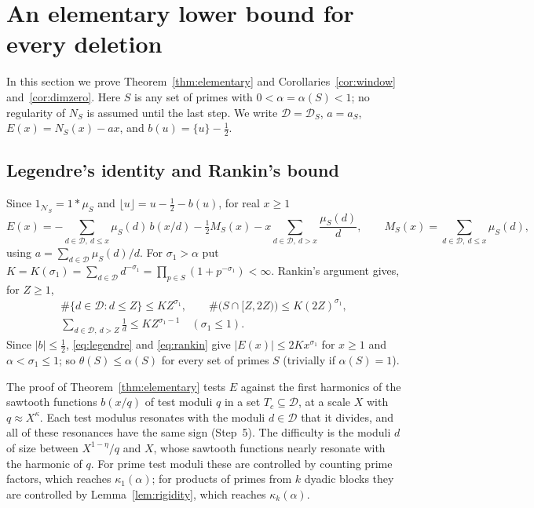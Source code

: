 \documentclass[11pt]{amsart}
\theoremstyle{remark}
\numberwithin{equation}{section}
\newcommand{\cD}{\mathcal{D}}
\newcommand{\cN}{\mathcal{N}}
\begin{document}
\section{An elementary lower bound for every deletion}\label{sec:elementary}

In this section we prove Theorem~\ref{thm:elementary} and Corollaries~\ref{cor:window} and~\ref{cor:dimzero}. Here $S$ is any set of primes with $0<\alpha=\alpha(S)<1$; no regularity of $N_S$ is assumed until the last step. We write $\cD=\cD_S$, $a=a_S$, $E(x)=N_S(x)-ax$, and $b(u)=\{u\}-\tfrac12$.

\subsection{Legendre's identity and Rankin's bound}\label{sec:legendre}
Since $1_{\cN_S}=1*\mu_S$ and $\lfloor u\rfloor=u-\tfrac12-b(u)$, for real $x\ge1$
\begin{equation}\label{eq:legendre}
E(x)=-\sum_{d\in\cD,\ d\le x}\mu_S(d)\,b(x/d)-\tfrac12M_S(x)-x\sum_{d\in\cD,\ d>x}\frac{\mu_S(d)}{d},\qquad M_S(x)=\sum_{d\in\cD,\ d\le x}\mu_S(d),
\end{equation}
using $a=\sum_{d\in\cD}\mu_S(d)/d$. For $\sigma_1>\alpha$ put $K=K(\sigma_1)=\sum_{d\in\cD}d^{-\sigma_1}=\prod_{p\in S}(1+p^{-\sigma_1})<\infty$. Rankin's argument gives, for $Z\ge1$,
\begin{equation}\label{eq:rankin}
\begin{gathered}
\#\{d\in\cD:d\le Z\}\le KZ^{\sigma_1},\qquad \#\bigl(S\cap[Z,2Z)\bigr)\le K(2Z)^{\sigma_1},\\
\sum_{d\in\cD,\ d>Z}\frac1d\le KZ^{\sigma_1-1}\quad(\sigma_1\le1).
\end{gathered}
\end{equation}
Since $|b|\le\tfrac12$, \eqref{eq:legendre} and \eqref{eq:rankin} give $|E(x)|\le2Kx^{\sigma_1}$ for $x\ge1$ and $\alpha<\sigma_1\le1$; so $\theta(S)\le\alpha(S)$ for every set of primes $S$ (trivially if $\alpha(S)=1$).

The proof of Theorem~\ref{thm:elementary} tests $E$ against the first harmonics of the sawtooth functions $b(x/q)$ of test moduli $q$ in a set $T_c\subseteq\cD$, at a scale $X$ with $q\approx X^{\kappa}$. Each test modulus resonates with the moduli $d\in\cD$ that it divides, and all of these resonances have the same sign (Step~5). The difficulty is the moduli $d$ of size between $X^{1-\eta}/q$ and $X$, whose sawtooth functions nearly resonate with the harmonic of $q$. For prime test moduli these are controlled by counting prime factors, which reaches $\kappa_1(\alpha)$; for products of primes from $k$ dyadic blocks they are controlled by Lemma~\ref{lem:rigidity}, which reaches $\kappa_k(\alpha)$.
\end{document}
